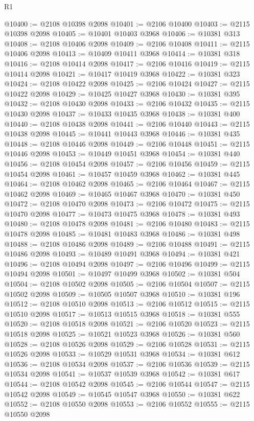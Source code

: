 \begin{lexlean}{R1}
\begin{coremodule}
@10400 := @2108 @10398 @2098
@10401 := @2106 @10400
@10403 := @2115 @10398 @2098
@10405 := @10401 @10403 @3968
@10406 := @10381 @313
@10408 := @2108 @10406 @2098
@10409 := @2106 @10408
@10411 := @2115 @10406 @2098
@10413 := @10409 @10411 @3968
@10414 := @10381 @318
@10416 := @2108 @10414 @2098
@10417 := @2106 @10416
@10419 := @2115 @10414 @2098
@10421 := @10417 @10419 @3968
@10422 := @10381 @323
@10424 := @2108 @10422 @2098
@10425 := @2106 @10424
@10427 := @2115 @10422 @2098
@10429 := @10425 @10427 @3968
@10430 := @10381 @395
@10432 := @2108 @10430 @2098
@10433 := @2106 @10432
@10435 := @2115 @10430 @2098
@10437 := @10433 @10435 @3968
@10438 := @10381 @400
@10440 := @2108 @10438 @2098
@10441 := @2106 @10440
@10443 := @2115 @10438 @2098
@10445 := @10441 @10443 @3968
@10446 := @10381 @435
@10448 := @2108 @10446 @2098
@10449 := @2106 @10448
@10451 := @2115 @10446 @2098
@10453 := @10449 @10451 @3968
@10454 := @10381 @440
@10456 := @2108 @10454 @2098
@10457 := @2106 @10456
@10459 := @2115 @10454 @2098
@10461 := @10457 @10459 @3968
@10462 := @10381 @445
@10464 := @2108 @10462 @2098
@10465 := @2106 @10464
@10467 := @2115 @10462 @2098
@10469 := @10465 @10467 @3968
@10470 := @10381 @450
@10472 := @2108 @10470 @2098
@10473 := @2106 @10472
@10475 := @2115 @10470 @2098
@10477 := @10473 @10475 @3968
@10478 := @10381 @493
@10480 := @2108 @10478 @2098
@10481 := @2106 @10480
@10483 := @2115 @10478 @2098
@10485 := @10481 @10483 @3968
@10486 := @10381 @498
@10488 := @2108 @10486 @2098
@10489 := @2106 @10488
@10491 := @2115 @10486 @2098
@10493 := @10489 @10491 @3968
@10494 := @10381 @421
@10496 := @2108 @10494 @2098
@10497 := @2106 @10496
@10499 := @2115 @10494 @2098
@10501 := @10497 @10499 @3968
@10502 := @10381 @504
@10504 := @2108 @10502 @2098
@10505 := @2106 @10504
@10507 := @2115 @10502 @2098
@10509 := @10505 @10507 @3968
@10510 := @10381 @196
@10512 := @2108 @10510 @2098
@10513 := @2106 @10512
@10515 := @2115 @10510 @2098
@10517 := @10513 @10515 @3968
@10518 := @10381 @555
@10520 := @2108 @10518 @2098
@10521 := @2106 @10520
@10523 := @2115 @10518 @2098
@10525 := @10521 @10523 @3968
@10526 := @10381 @560
@10528 := @2108 @10526 @2098
@10529 := @2106 @10528
@10531 := @2115 @10526 @2098
@10533 := @10529 @10531 @3968
@10534 := @10381 @612
@10536 := @2108 @10534 @2098
@10537 := @2106 @10536
@10539 := @2115 @10534 @2098
@10541 := @10537 @10539 @3968
@10542 := @10381 @617
@10544 := @2108 @10542 @2098
@10545 := @2106 @10544
@10547 := @2115 @10542 @2098
@10549 := @10545 @10547 @3968
@10550 := @10381 @622
@10552 := @2108 @10550 @2098
@10553 := @2106 @10552
@10555 := @2115 @10550 @2098

\end{coremodule}
\end{lexlean}
